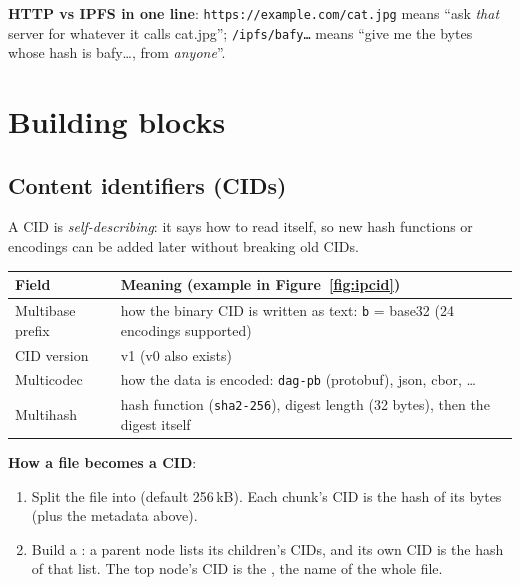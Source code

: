 \textbf{HTTP vs IPFS in one line}: \texttt{https://example.com/cat.jpg} means ``ask \emph{that} server for whatever it calls cat.jpg''; \texttt{/ipfs/bafy\dots}
means ``give me the bytes whose hash is bafy\dots, from \emph{anyone}''.

\section{Building blocks}

\subsection{Content identifiers (CIDs)}


A CID is \emph{self-describing}: it says how to read itself, so new hash functions or encodings can be added later without breaking old CIDs.
\begin{center}
\small
\begin{tabularx}{\linewidth}{@{}lX@{}}
\toprule
Field & Meaning (example in Figure~\ref{fig:ipcid})\\
\midrule
Multibase prefix & how the binary CID is written as text: \texttt{b} = base32 (24 encodings supported)\\
CID version & v1 (v0 also exists)\\
Multicodec & how the data is encoded: \texttt{dag-pb} (protobuf), json, cbor, \dots\\
Multihash & hash function (\texttt{sha2-256}), digest length (32 bytes), then the digest itself\\
\bottomrule
\end{tabularx}
\end{center}

\textbf{How a file becomes a CID}:
\begin{enumerate}
  \item Split the file into  (default 256\,kB). Each chunk's CID is the hash of its bytes (plus the metadata above).
  \item Build a : a parent node lists its children's CIDs, and its own CID is the hash of that list. The top node's CID is the , the name of
        the whole file.
\end{enumerate}

